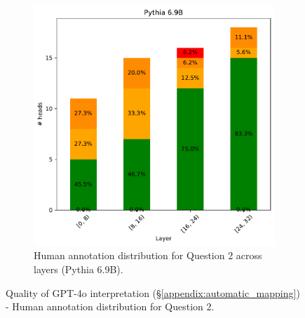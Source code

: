 \documentclass[11pt]{article}
\newcommand{\PythiaSevenB}{Pythia 6.9B}
\newcommand{\GPTFourO}{GPT-4o}
\begin{document}
\begin{figure}[tp]
    \begin{subfigure}{\columnwidth}
        \includegraphics[scale=0.45]
        {figures/human_validation/q2_by_layer_pythia}
        \caption{Human annotation distribution for Question 2 across layers (\PythiaSevenB{}).}
    \end{subfigure}
\caption{Quality of \GPTFourO{} interpretation (\S\ref{appendix:automatic_mapping}) - Human annotation distribution for Question 2.}
\label{fig:human_val_q2}
\end{figure}
\end{document}
